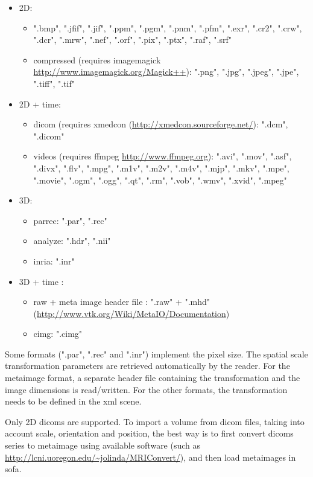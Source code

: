 \begin{itemize}
\item 2D:
	\begin{itemize}
	\item ".bmp", ".jfif", ".jif", ".ppm", ".pgm", ".pnm", ".pfm", ".exr", ".cr2", ".crw", ".dcr", ".mrw", ".nef", ".orf", ".pix", ".ptx", ".raf", ".srf"
	\item compressed (requires imagemagick \url{http://www.imagemagick.org/Magick++}): ".png", ".jpg", ".jpeg", ".jpe", ".tiff", ".tif"
	\end{itemize}
\item 2D + time:
	\begin{itemize}
	\item dicom (requires xmedcon (\url{http://xmedcon.sourceforge.net/}): ".dcm", ".dicom"
	\item videos (requires ffmpeg \url{http://www.ffmpeg.org}): ".avi", ".mov", ".asf", ".divx", ".flv", ".mpg", ".m1v", ".m2v", ".m4v", ".mjp", ".mkv", ".mpe", ".movie", ".ogm", ".ogg", ".qt", ".rm", ".vob", ".wmv", ".xvid", ".mpeg"	
	\end{itemize}
\item 3D:
	\begin{itemize}
	\item parrec: ".par", ".rec"
	\item analyze: ".hdr", ".nii"
	\item inria: ".inr"
	\end{itemize}
\item 3D + time :
	\begin{itemize}
	\item raw + meta image header file : ".raw" + ".mhd" (\url{http://www.vtk.org/Wiki/MetaIO/Documentation})
	\item cimg: ".cimg"
	\end{itemize}
\end{itemize}

\noindent Some formats (".par", ".rec" and ".inr") implement the pixel size. The spatial scale transformation parameters are retrieved automatically by the reader. For the metaimage format, a separate header file containing the transformation and the image dimensions is read/written. For the other formats, the transformation needs to be defined in the xml scene.

\noindent Only 2D dicoms are supported. To import a volume from dicom files, taking into account scale, orientation and position, the best way is to first convert dicoms series to metaimage using available software  (such as \url{http://lcni.uoregon.edu/~jolinda/MRIConvert/}), and then load metaimages in sofa.

